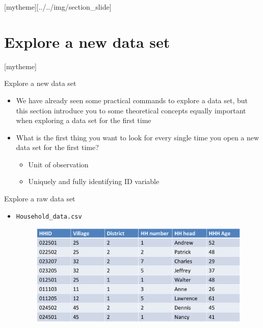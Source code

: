 \documentclass[aspectratio=169]{beamer}
\newcommand{\sectionpic}[2]{
	\setbeamertemplate{section page}[mytheme][#2]
	\section{#1}
	\setbeamertemplate{section page}[mytheme]
}
\begin{document}
\sectionpic{Explore a new data set}{../../img/section_slide}

\begin{frame}{Explore a new data set}
	\begin{itemize}
		\item We have already seen some practical commands to explore a data set, but this section introduce you to some theoretical concepts equally important when exploring a data set for the first time
		\item What is the first thing you want to look for every single time you open a new data set for the first time?
		\begin{itemize}
			\item Unit of observation
			\item Uniquely and fully identifying ID variable
		\end{itemize}
	\end{itemize}
\end{frame}



\begin{frame}{Explore a raw data set}
	\begin{itemize}
		\item \texttt{Household\_data.csv}
		\begin{figure}
			\centering
			\includegraphics[width=\linewidth]{img/raw1}
		\end{figure}
	\end{itemize}
\end{frame}
\end{document}
